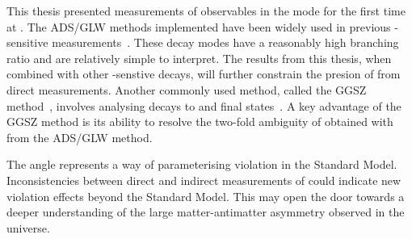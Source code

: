 This thesis presented measurements of \CP observables in the \btodkst mode for the first time at \lhcb. The ADS/GLW methods implemented have been widely used in previous \Pgamma-sensitive measurements~\cite{LHCb-PAPER-2017-021,LHCb-PAPER-2016-006}. These \Dz decay modes have a reasonably high branching ratio and are relatively simple to interpret. The results from this thesis, when combined with other \Pgamma-senstive decays, will further constrain the presion of \Pgamma from direct measurements. Another commonly used method, called the GGSZ method~\cite{GGSZ}, involves analysing \D decays to \KS\pip\pim and \KS\Kp\Km final states~\cite{LHCb-PAPER-2014-041}. A key advantage of the GGSZ method is its ability to resolve the two-fold ambiguity of \Pgamma obtained with from the ADS/GLW method. 

The angle \Pgamma represents a way of parameterising \CP violation in the Standard Model. Inconsistencies between direct and indirect measurements of \Pgamma could indicate new \CP violation effects beyond the Standard Model. This may open the door towards a deeper understanding of the large matter-antimatter asymmetry observed in the universe.
